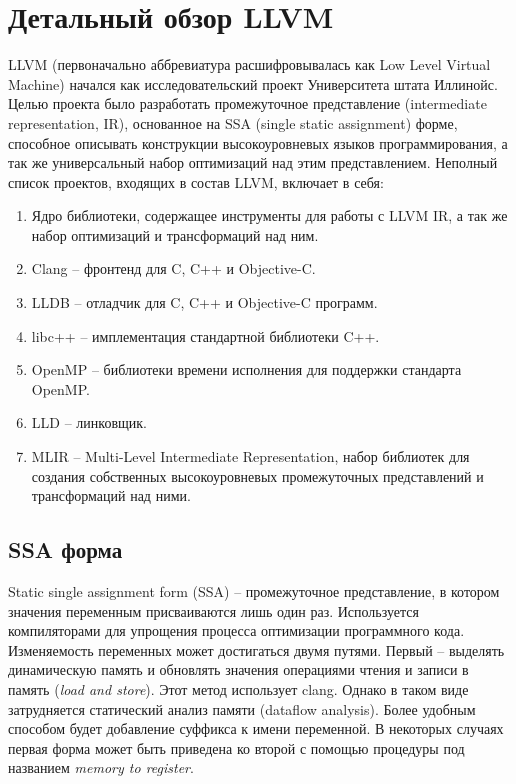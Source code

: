 \clearpage

\section{Детальный обзор LLVM}

LLVM (первоначально аббревиатура расшифровывалась как Low Level Virtual Machine) начался как
исследовательский проект Университета штата Иллинойс. Целью проекта было разработать промежуточное
представление (intermediate representation, IR), основанное на SSA (single static assignment) 
форме, способное описывать конструкции высокоуровневых языков программирования, а так же
универсальный набор оптимизаций над этим представлением. Неполный список проектов, входящих
в состав LLVM, включает в себя:

\begin{enumerate}
\item Ядро библиотеки, содержащее инструменты для работы с LLVM IR, а так же набор
оптимизаций и трансформаций над ним.
\item Clang -- фронтенд для C, C++ и Objective-C.
\item LLDB -- отладчик для C, C++ и Objective-C программ.
\item libc++ -- имплементация стандартной библиотеки C++.
\item OpenMP -- библиотеки времени исполнения для поддержки стандарта OpenMP.
\item LLD -- линковщик.
\item MLIR -- Multi-Level Intermediate Representation, набор библиотек для
создания собственных высокоуровневых промежуточных представлений и трансформаций
над ними. 
\end{enumerate}

\subsection{SSA форма}
Static single assignment form (SSA) -- промежуточное представление, в котором
значения переменным присваиваются лишь один раз. Используется компиляторами для
упрощения процесса оптимизации программного кода. Изменяемость переменных может
достигаться двумя путями. Первый -- выделять динамическую память и обновлять
значения операциями чтения и записи в память (\textit{load and store}). Этот
метод использует clang. Однако в таком виде затрудняется статический анализ
памяти (dataflow analysis). Более удобным способом будет добавление суффикса к
имени переменной. В некоторых случаях первая форма может быть приведена ко 
второй с помощью процедуры под названием \textit{memory to register}.

